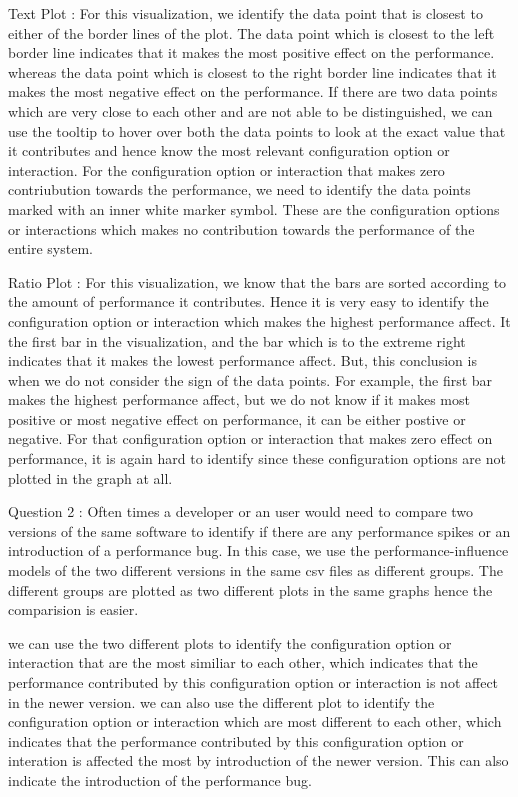  Text Plot : For this visualization, we identify the data point that is closest to either of the border lines of the plot. The data point which is closest to the left border line indicates that it makes the most positive effect on the performance. whereas the data point which is closest to the right border line indicates that it makes the most negative effect on the performance. If there are two data points which are very close to each other and are not able to be distinguished, we can use the tooltip to hover over both the data points to look at the exact value that it contributes and hence know the most relevant configuration option or interaction. For the configuration option or interaction that makes zero contriubution towards the performance, we need to identify the data points marked with an inner white marker symbol. These are the configuration options or interactions which makes no contribution towards the performance of the entire system.

 Ratio Plot : For this visualization, we know that the bars are sorted according to the amount of performance it contributes. Hence it is very easy to identify the configuration option or interaction which makes the highest performance affect. It the first bar in the visualization, and the bar which is to the extreme right indicates that it makes the lowest performance affect. But, this conclusion is when we do not consider the sign of the data points. For example, the first bar makes the highest performance affect, but we do not know if it makes most positive or most negative effect on performance, it can be either postive or negative. For that configuration option or interaction that makes zero effect on performance, it is again hard to identify since these configuration options are not plotted in the graph at all.

 Question 2 : Often times a developer or an user would need to compare two versions of the same software to identify if there are any performance spikes or an introduction of a performance bug. In this case, we use the performance-influence models of the two different versions in the same csv files as different groups. The different groups are plotted as two different plots in the same graphs hence the comparision is easier.

we can use the two different plots to identify the configuration option or interaction that are the most similiar to each other, which indicates that the performance contributed by this configuration option or interaction is not affect in the newer version. we can also use the different plot to identify the configuration option or interaction which are most different to each other, which indicates that the performance contributed by this configuration option or interation is affected the most by introduction of the newer version. This can also indicate the introduction of the performance bug.

